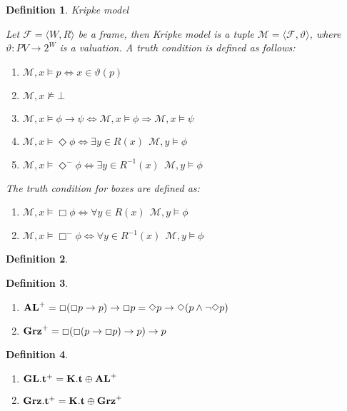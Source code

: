 \documentclass[a4paper]{article}
\theoremstyle{defin}
\newtheorem{defin}{Definition}
\theoremstyle{theorem}
\theoremstyle{prop}
\theoremstyle{lemma}
\theoremstyle{ex}
\theoremstyle{col}
\newcommand{\BoxM}{\Box^{-}}
\newcommand{\DiamondM}{\Diamond^{-}}
\begin{document}
\begin{defin} Kripke model

  Let $\mathcal{F} = \langle W, R \rangle$ be a frame, then Kripke model is a tuple $\mathcal{M} = \langle \mathcal{F}, \vartheta \rangle$, where $\vartheta : PV \to 2^W$ is a valuation. A truth condition is defined as follows:

  \begin{enumerate}
    \item $\mathcal{M}, x \models p \Leftrightarrow x \in \vartheta(p)$
    \item $\mathcal{M}, x \nvDash \bot$
    \item $\mathcal{M}, x \models \phi \to \psi \Leftrightarrow \mathcal{M}, x \models \phi \Rightarrow \mathcal{M}, x \models \psi$
    \item $\mathcal{M}, x \models \Diamond \phi \Leftrightarrow \exists y \in R(x) \:\: \mathcal{M}, y \models \phi$
    \item $\mathcal{M}, x \models \DiamondM \phi \Leftrightarrow \exists y \in R^{-1}(x) \:\: \mathcal{M}, y \models \phi$
  \end{enumerate}

  The truth condition for boxes are defined as:

  \begin{enumerate}
    \item $\mathcal{M}, x \models \Box \phi \Leftrightarrow \forall y \in R(x) \:\: \mathcal{M}, y \models \phi$
    \item $\mathcal{M}, x \models \BoxM \phi \Leftrightarrow \forall y \in R^{-1}(x) \:\: \mathcal{M}, y \models \phi$
  \end{enumerate}
\end{defin}

\begin{defin}
  
\end{defin}

\begin{defin}
$ $

  \begin{enumerate}
    \item ${\bf AL}^{+} = \Box (\Box p \to p) \to \Box p = \Diamond p \to \Diamond (p \land \neg \Diamond p)$
    \item ${\bf Grz}^{+} = \Box (\Box (p \to \Box p) \to p) \to p$
  \end{enumerate}
\end{defin}

\begin{defin}
$ $

  \begin{enumerate}
    \item ${\bf GL}.{\bf t}^{+} = {\bf K}.{\bf t} \oplus {\bf AL}^{+}$
    \item ${\bf Grz}.{\bf t}^{+} = {\bf K}.{\bf t} \oplus {\bf Grz}^{+}$
  \end{enumerate}
\end{defin}
\end{document}
